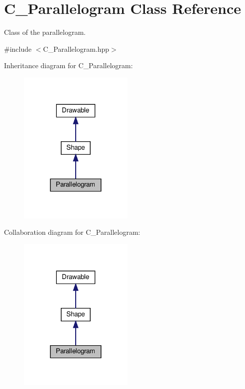 \hypertarget{classParallelogram}{}\section{C_Parallelogram Class Reference}
\label{classParallelogram}


Class of the parallelogram.  




{\ttfamily \#include $<$C_Parallelogram.\+hpp$>$}



Inheritance diagram for C_Parallelogram\+:\nopagebreak
\begin{figure}[H]
\begin{center}
\leavevmode
\includegraphics[width=156pt]{classParallelogram__inherit__graph}
\end{center}
\end{figure}


Collaboration diagram for C_Parallelogram\+:\nopagebreak
\begin{figure}[H]
\begin{center}
\leavevmode
\includegraphics[width=156pt]{classParallelogram__coll__graph}
\end{center}
\end{figure}
